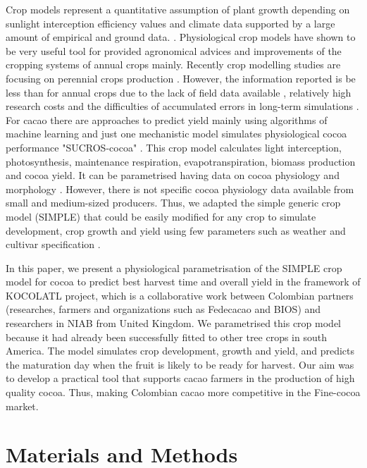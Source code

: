 \documentclass[gene,journal,article,submit,moreauthors,pdftex]{Definitions/mdpi}
\begin{document}
Crop models represent a quantitative assumption of plant growth depending on sunlight interception efficiency values and climate data supported by a large amount of empirical and ground data. \citep{Reynolds2018}. Physiological crop models have shown to be very useful tool for provided agronomical advices and improvements of the cropping systems of annual crops mainly. Recently crop modelling studies are focusing on  perennial crops  production \citep{zuidema2005, Zao2019simple, Bai2020, Romero2021}. However, the information reported  is be less than for annual crops due to the lack of field data available , relatively high research costs and the difficulties of accumulated errors in long-term simulations \citep{zuidema2005}. For cacao there are  approaches  to predict yield mainly  using algorithms of machine learning \citep{lamos2020} and just one mechanistic model simulates physiological cocoa performance  "SUCROS-cocoa" \citep{zuidema2005}. This crop model calculates light interception, photosynthesis, maintenance respiration,
evapotranspiration, biomass production and cocoa yield. It can be parametrised having data on cocoa physiology and morphology \citep{zuidema2005}. However,  there is not specific cocoa physiology data available from small and medium-sized producers. Thus, we adapted the simple generic crop model (SIMPLE) that could be easily modified for any crop to simulate development, crop growth and yield using few parameters such as weather and cultivar specification \citep{Zao2019simple}.

In this paper, we present a physiological parametrisation of the SIMPLE crop model \citep{Zao2019simple} for cocoa to predict best harvest time and overall yield in the framework of KOCOLATL project, which is a collaborative work between Colombian partners (researches, farmers and organizations such as Fedecacao and BIOS) and researchers in NIAB from United Kingdom. We parametrised this crop model  because it had already been successfully fitted to other tree crops in south America. The model simulates crop development, growth and yield, and predicts the maturation day when the fruit is likely to be ready for harvest. Our aim was to develop a practical tool that supports cacao farmers in the production of high quality cocoa. Thus, making Colombian cacao more competitive in the Fine-cocoa market.


\section{Materials and Methods}
\end{document}
